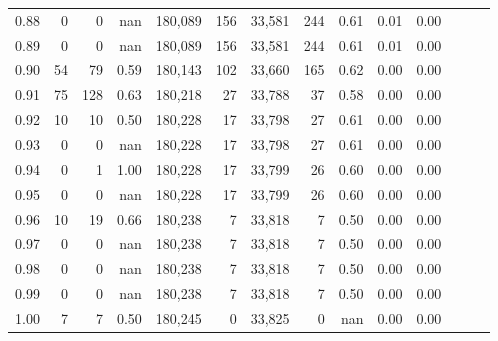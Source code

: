 \begin{tabular}{rrrrrrrrrrrrrr}
0.88 &       0 &      0 &   nan &  180,089 &      156 &  33,581 &     244 &  0.61 &  0.01 &      0.00 \\
0.89 &       0 &      0 &   nan &  180,089 &      156 &  33,581 &     244 &  0.61 &  0.01 &      0.00 \\
0.90 &      54 &     79 &  0.59 &  180,143 &      102 &  33,660 &     165 &  0.62 &  0.00 &      0.00 \\
0.91 &      75 &    128 &  0.63 &  180,218 &       27 &  33,788 &      37 &  0.58 &  0.00 &      0.00 \\
0.92 &      10 &     10 &  0.50 &  180,228 &       17 &  33,798 &      27 &  0.61 &  0.00 &      0.00 \\
0.93 &       0 &      0 &   nan &  180,228 &       17 &  33,798 &      27 &  0.61 &  0.00 &      0.00 \\
0.94 &       0 &      1 &  1.00 &  180,228 &       17 &  33,799 &      26 &  0.60 &  0.00 &      0.00 \\
0.95 &       0 &      0 &   nan &  180,228 &       17 &  33,799 &      26 &  0.60 &  0.00 &      0.00 \\
0.96 &      10 &     19 &  0.66 &  180,238 &        7 &  33,818 &       7 &  0.50 &  0.00 &      0.00 \\
0.97 &       0 &      0 &   nan &  180,238 &        7 &  33,818 &       7 &  0.50 &  0.00 &      0.00 \\
0.98 &       0 &      0 &   nan &  180,238 &        7 &  33,818 &       7 &  0.50 &  0.00 &      0.00 \\
0.99 &       0 &      0 &   nan &  180,238 &        7 &  33,818 &       7 &  0.50 &  0.00 &      0.00 \\
1.00 &       7 &      7 &  0.50 &  180,245 &        0 &  33,825 &       0 &   nan &  0.00 &      0.00 \\
\bottomrule
\end{tabular}
